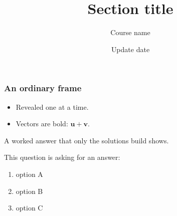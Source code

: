 \documentclass[font-size=12pt]{ltx-talk}     %
\theoremstyle{definition}
\newcommand{\ifinstructor}[2]{\iftoggle{instructor}{#1}{#2}}
\newcommand{\pollcode}{XYZXYZ}               %
\newcommand{\pollsite}{polling.example.edu}  %
\newcommand{\vu}{\mathbf{u}}
\newcommand{\vv}{\mathbf{v}}
\begin{document}
\toggletrue{instructor}
\togglefalse{instructorsolutions}
\title{Section title}
\author{Course name}
\date{\alert{Update date}}
\begin{frame}
  \ifinstructor{%
  \maketitle[frame-style = wallpaper, horizontal-alignment = left]
  \begin{columns}
    \begin{column}{0.5\textwidth}
      Reminders:
      \begin{itemize}
        \item \alert{Update reminders.}
      \end{itemize}
    \end{column}
    \begin{column}{0.45\textwidth}
      \begin{flushright}
        Poll code:
        \par\smallskip\par
        {\fontsize{40pt}{40pt}\selectfont \pollcode} \\
        \pollsite
      \end{flushright}
    \end{column}
  \end{columns}
  }{%
    \frametitle{Section title}
  }
\end{frame}
\begin{frame}
  \frametitle{An ordinary frame}
  \begin{itemize}[<+->]
    \item Revealed one at a time.
    \item Vectors are bold: \(\vu + \vv\).
  \end{itemize}
  \begin{instructorsol}
    A worked answer that only the solutions build shows.
  \end{instructorsol}
\end{frame}
\begin{pollframe}
  This question is asking for an answer:
  \begin{enumerate}[item-label=\Alph*.]
    \item option A
    \item option B
    \item option C
  \end{enumerate}
\end{pollframe}
\end{document}
